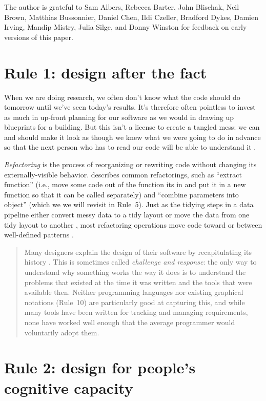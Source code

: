 \documentclass[10pt,letterpaper]{article}
\begin{document}
The author is grateful to Sam Albers,
Rebecca Barter,
John Blischak,
Neil Brown,
Matthias Bussonnier,
Daniel Chen,
Ildi Czeller,
Bradford Dykes,
Damien Irving,
Mandip Mistry,
Julia Silge,
and Donny Winston
for feedback on early versions of this paper.

\section*{Rule 1: design after the fact}

When we are doing research,
we often don't know what the code should do tomorrow
until we've seen today's results.
It's therefore often pointless to invest as much in up-front planning for our software
as we would in drawing up blueprints for a building.
But this isn't a license to create a tangled mess:
we can and should make it look as though we knew what we were going to do in advance
so that the next person who has to read our code will be able to understand it \cite{Parnas1986}.

\emph{Refactoring} is the process of reorganizing or rewriting code
without changing its externally-visible behavior.
\cite{Fowler2018} describes common refactorings,
such as ``extract function''
(i.e., move some code out of the function its in
and put it in a new function so that it can be called separately)
and ``combine parameters into object''
(which we we will revisit in Rule~5).
Just as the tidying steps in a data pipeline
either convert messy data to a tidy layout or move the data from one tidy layout to another \cite{Wickham2017},
most refactoring operations move code toward or between well-defined patterns \cite{Kerievsky2004}.

\begin{quotation}
  \noindent
  Many designers explain the design of their software
  by recapitulating its history \cite{Brown2011,Brown2012}.
  This is sometimes called \emph{challenge and response}:
  the only way to understand why something works the way it does
  is to understand the problems that existed at the time it was written
  and the tools that were available then.
  Neither programming languages nor existing graphical notations (Rule~10)
  are particularly good at capturing this,
  and while many tools have been written for tracking and managing requirements,
  none have worked well enough that the average programmer would voluntarily adopt them.
\end{quotation}

\section*{Rule 2: design for people's cognitive capacity}
\end{document}
